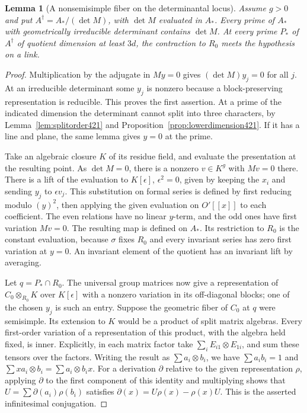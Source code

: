 \documentclass[a4paper,11pt]{article}
\newtheorem{lemma}[proposition]{Lemma}
\theoremstyle{definition}
\theoremstyle{remark}
\numberwithin{equation}{section}
\begin{document}
\begin{lemma}[A nonsemisimple fiber on the determinantal locus]\leavevmode
\label{lem:singularblock422}
Assume \(g>0\) and put \(A^\dagger=A_*/(\det M)\), with
\(\det M\) evaluated in \(A_*\). Every prime of \(A_*\) with
geometrically irreducible determinant contains \(\det M\).
At every prime \(P_*\) of \(A^\dagger\) of quotient dimension
at least \(3d\), the contraction to \(R_0\) meets the hypothesis
on a link.
\end{lemma}
\begin{proof}
Multiplication by the adjugate in \(My=0\) gives
\((\det M)y_j=0\) for all \(j\). At an irreducible determinant
some \(y_j\) is nonzero because a block-preserving representation
is reducible. This proves the first assertion. At a prime of
the indicated dimension the determinant cannot split into three
characters, by Lemma~\ref{lem:splitorder421} and
Proposition~\ref{prop:lowerdimension421}. If it has a line
and plane, the same lemma gives \(y=0\) at the prime.

Take an algebraic closure \(K\) of its residue field, and
evaluate the presentation at the resulting point. As
\(\det M=0\), there is a nonzero \(v\in K^g\) with \(Mv=0\)
there. There is a lift of the evaluation to \(K[\epsilon]\),
\(\epsilon^2=0\), given by keeping the \(x_i\) and sending
\(y_j\) to \(\epsilon v_j\). This substitution on formal series
is defined by first reducing modulo \((y)^2\), then applying
the given evaluation on \(O'[[x]]\) to each coefficient.
The even relations have no linear \(y\)-term, and the odd
ones have first variation \(Mv=0\). The resulting map is
defined on \(A_*\). Its restriction to \(R_0\) is the constant
evaluation, because \(\sigma\) fixes \(R_0\) and every invariant
series has zero first variation at \(y=0\). An invariant
element of the quotient has an invariant lift by averaging.

Let \(q=P_*\cap R_0\). The universal group matrices now give
a representation of \(C_0\otimes_{R_0} K\) over \(K[\epsilon]\)
with a nonzero variation in its off-diagonal blocks; one of
the chosen \(y_j\) is such an entry. Suppose the geometric
fiber of \(C_0\) at \(q\) were semisimple. Its extension to
\(K\) would be a product of split matrix algebras. Every
first-order variation of a representation of this product,
with the algebra held fixed, is inner. Explicitly, in each
matrix factor take \(\sum_i E_{i1}\otimes E_{1i}\), and sum
these tensors over the factors. Writing the result as
\(\sum a_i\otimes b_i\), we have \(\sum a_i b_i=1\) and
\(\sum xa_i\otimes b_i=\sum a_i\otimes b_i x\).
For a derivation \(\partial\) relative to the given representation
\(\rho\), applying \(\partial\) to the first component of this
identity and multiplying shows that \(U=\sum\partial(a_i)\rho(b_i)\)
satisfies \(\partial(x)=U\rho(x)-\rho(x)U\).
This is the asserted infinitesimal conjugation.


\end{proof}
\end{document}
